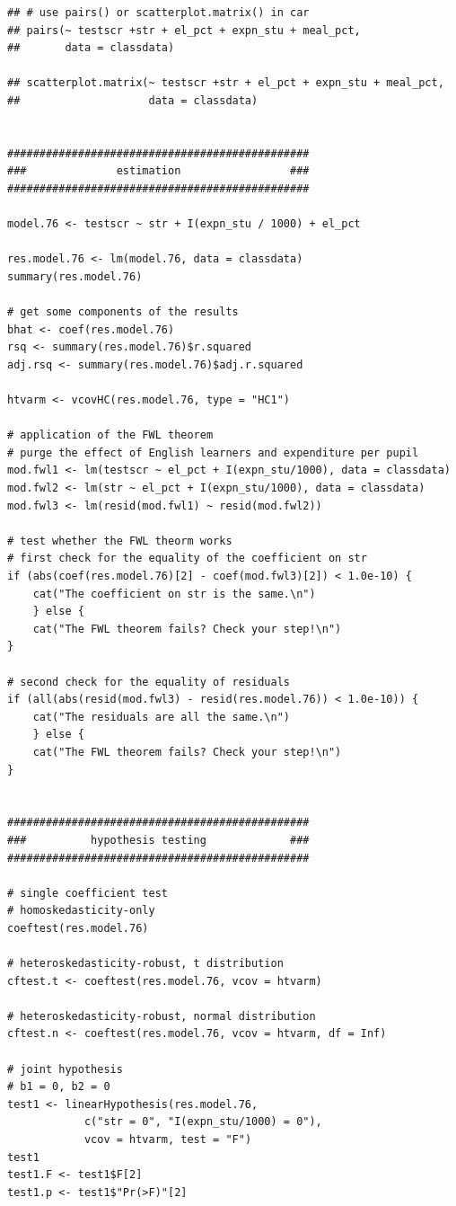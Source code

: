 \documentclass[a4paper,11pt]{article}
\begin{document}
\begin{verbatim}
## # use pairs() or scatterplot.matrix() in car
## pairs(~ testscr +str + el_pct + expn_stu + meal_pct,
##       data = classdata)

## scatterplot.matrix(~ testscr +str + el_pct + expn_stu + meal_pct,
##                    data = classdata)


###############################################
###              estimation                 ###
###############################################

model.76 <- testscr ~ str + I(expn_stu / 1000) + el_pct

res.model.76 <- lm(model.76, data = classdata)
summary(res.model.76)

# get some components of the results
bhat <- coef(res.model.76)
rsq <- summary(res.model.76)$r.squared
adj.rsq <- summary(res.model.76)$adj.r.squared

htvarm <- vcovHC(res.model.76, type = "HC1")

# application of the FWL theorem
# purge the effect of English learners and expenditure per pupil
mod.fwl1 <- lm(testscr ~ el_pct + I(expn_stu/1000), data = classdata)
mod.fwl2 <- lm(str ~ el_pct + I(expn_stu/1000), data = classdata)
mod.fwl3 <- lm(resid(mod.fwl1) ~ resid(mod.fwl2))

# test whether the FWL theorm works
# first check for the equality of the coefficient on str
if (abs(coef(res.model.76)[2] - coef(mod.fwl3)[2]) < 1.0e-10) {
    cat("The coefficient on str is the same.\n")
    } else {
    cat("The FWL theorem fails? Check your step!\n")
}

# second check for the equality of residuals
if (all(abs(resid(mod.fwl3) - resid(res.model.76)) < 1.0e-10)) {
    cat("The residuals are all the same.\n")
    } else {
    cat("The FWL theorem fails? Check your step!\n")
}


###############################################
###          hypothesis testing             ###
###############################################

# single coefficient test
# homoskedasticity-only
coeftest(res.model.76)

# heteroskedasticity-robust, t distribution
cftest.t <- coeftest(res.model.76, vcov = htvarm)

# heteroskedasticity-robust, normal distribution
cftest.n <- coeftest(res.model.76, vcov = htvarm, df = Inf)

# joint hypothesis
# b1 = 0, b2 = 0
test1 <- linearHypothesis(res.model.76,
            c("str = 0", "I(expn_stu/1000) = 0"),
            vcov = htvarm, test = "F")
test1
test1.F <- test1$F[2]
test1.p <- test1$"Pr(>F)"[2]


\end{verbatim}
\end{document}
